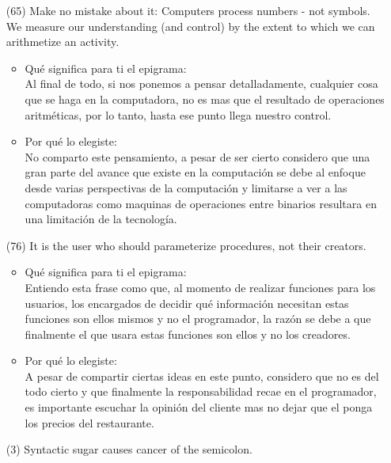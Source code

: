 \documentclass{article}
\begin{document}
\begin{itemize}
    \item[(65)]Make no mistake about it: Computers process numbers - not symbols. We measure our
understanding (and control) by the extent to which we can arithmetize an activity.
    \begin{itemize}
        \item Qué significa para ti el epigrama:\\
        Al final de todo, si nos ponemos a pensar detalladamente, cualquier cosa que se haga en la computadora, no es mas que el resultado de operaciones aritméticas, por lo tanto, hasta ese punto llega nuestro control.
        \item Por qué lo elegiste:\\
        No comparto este pensamiento, a pesar de ser cierto considero que una gran parte del avance que existe en la computación se debe al enfoque desde varias perspectivas de la computación y limitarse a ver a las computadoras como maquinas de operaciones entre binarios resultara en una limitación de la tecnología.
    \end{itemize}
    \item[(76)]It is the user who should parameterize procedures, not their creators.
    \begin{itemize}
        \item Qué significa para ti el epigrama:\\
        Entiendo esta frase como que, al momento de realizar funciones para los usuarios, los encargados de decidir qué información necesitan estas funciones son ellos mismos y no el programador, la razón se debe a que finalmente el que usara estas funciones son ellos y no los creadores.
        \item Por qué lo elegiste:\\
        A pesar de compartir ciertas ideas en este punto, considero que no es del todo cierto y que finalmente la responsabilidad recae en el programador, es importante escuchar la opinión del cliente mas no dejar que el ponga los precios del restaurante.
    \end{itemize}
    \item[(3)]Syntactic sugar causes cancer of the semicolon.
    \begin{itemize}

\end{itemize}
\end{itemize}
\end{document}
